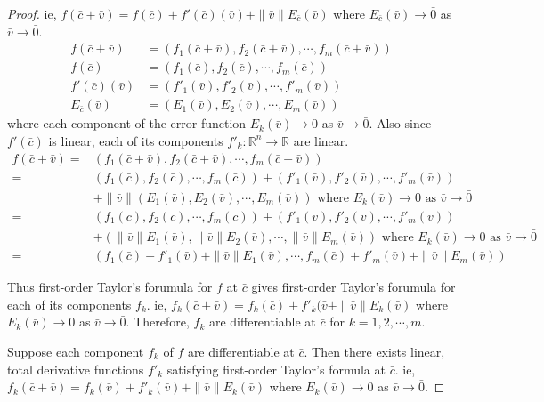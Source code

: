 \begin{proof}
ie, $f(\bar{c}+\bar{v}) = f(\bar{c}) + f'(\bar{c})(\bar{v}) + \|\bar{v}\| E_{\bar{c}}(\bar{v})$ where $E_{\bar{c}}(\bar{v}) \to \bar{0}$ as $\bar{v} \to \bar{0}$.
\begin{align*}
	f(\bar{c}+\bar{v}) & = \left( f_1(\bar{c}+\bar{v}), f_2(\bar{c}+\bar{v}), \cdots, f_m(\bar{c}+\bar{v}) \right)\\
	f(\bar{c}) & = \left( f_1(\bar{c}), f_2(\bar{c}), \cdots, f_m(\bar{c}) \right) \\
	f'(\bar{c})(\bar{v}) & = \left( f'_1(\bar{v}), f'_2(\bar{v}), \cdots, f'_m(\bar{v}) \right) \\
	E_{\bar{c}}(\bar{v}) & = \left( E_1(\bar{v}), E_2(\bar{v}), \cdots, E_m(\bar{v}) \right)
\end{align*}
where each component of the error function $E_k(\bar{v}) \to 0$ as $\bar{v} \to \bar{0}$.
Also since $f'(\bar{c})$ is linear, each of its components $f'_k : \mathbb{R}^n \to \mathbb{R}$ are linear.
\begin{align*}
	f(\bar{c}+\bar{v}) = & \left( f_1(\bar{c}+\bar{v}), f_2(\bar{c}+\bar{v}), \cdots, f_m(\bar{c}+\bar{v}) \right) \\
	= & \left( f_1(\bar{c}), f_2(\bar{c}), \cdots, f_m(\bar{c}) \right) + \left( f'_1(\bar{v}), f'_2(\bar{v}), \cdots, f'_m(\bar{v}) \right) \\
	& + \|\bar{v}\|\left(E_1(\bar{v}), E_2(\bar{v}), \cdots, E_m(\bar{v}) \right) \text{ where } E_k(\bar{v}) \to 0 \text{ as } \bar{v} \to \bar{0}\\
	= & \left( f_1(\bar{c}), f_2(\bar{c}), \cdots, f_m(\bar{c}) \right) + \left( f'_1(\bar{v}), f'_2(\bar{v}), \cdots, f'_m(\bar{v}) \right) \\
	& + \left(\|\bar{v}\|E_1(\bar{v}), \|\bar{v}\|E_2(\bar{v}), \cdots, \|\bar{v}\|E_m(\bar{v}) \right) \text{ where } E_k(\bar{v}) \to 0 \text{ as } \bar{v} \to \bar{0}\\
	= & \left( f_1(\bar{c}) + f'_1(\bar{v}) + \|\bar{v}\|E_1(\bar{v}), \cdots, f_m(\bar{c}) + f'_m(\bar{v}) + \|\bar{v}\|E_m(\bar{v}) \right) 
\end{align*}

Thus first-order Taylor's forumula for $f$ at $\bar{c}$ gives first-order Taylor's forumula for each of its components $f_k$.
ie, $f_k(\bar{c}+\bar{v}) = f_k(\bar{c}) + f'_k(\bar{v} + \|\bar{v}\|E_k(\bar{v})$ where $E_k(\bar{v}) \to 0$ as $\bar{v} \to \bar{0}$.
Therefore, $f_k$ are differentiable at $\bar{c}$ for $k = 1,2,\cdots, m$.

Suppose each component $f_k$ of $f$ are differentiable at $\bar{c}$.
Then there exists linear, total derivative functions $f'_k$ satisfying first-order Taylor's formula at $\bar{c}$.
ie, $f_k(\bar{c}+\bar{v}) = f_k(\bar{v}) + f'_k(\bar{v}) + \|\bar{v}\|E_k(\bar{v})$ where $E_k(\bar{v}) \to 0$ as $\bar{v} \to \bar{0}$.


\end{proof}
